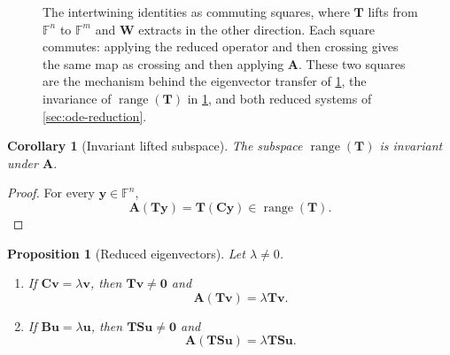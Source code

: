 \documentclass[11pt]{article}
\newcommand{\F}{\mathbb{F}}
\newcommand{\mat}[1]{\mathbf{#1}}
\newcommand{\vect}[1]{\mathbf{#1}}
\newcommand{\range}{\operatorname{range}}
\newtheorem{proposition}[proposition]{Proposition}
\newtheorem{corollary}[corollary]{Corollary}
\theoremstyle{definition}
\theoremstyle{remark}
\begin{document}
\begin{figure}[!ht]
  \centering
  \caption{The intertwining identities as commuting squares, where \(\mat{T}\) lifts from \(\F^n\) to \(\F^m\) and \(\mat{W}\) extracts in the other direction. Each square commutes: applying the reduced operator and then crossing gives the same map as crossing and then applying \(\mat{A}\). These two squares are the mechanism behind the eigenvector transfer of \cref{prop:reduced-eigenvectors}, the invariance of \(\range(\mat{T})\) in \cref{cor:invariant-range}, and both reduced systems of \cref{sec:ode-reduction}.}
  \label{fig:intertwining}
\end{figure}

\begin{corollary}[Invariant lifted subspace]
\label{cor:invariant-range}
The subspace \(\range(\mat{T})\) is invariant under \(\mat{A}\).
\end{corollary}

\begin{proof}
For every \(\vect{y}\in\F^n\),
\[
  \mat{A}(\mat{T}\vect{y})
  =\mat{T}(\mat{C}\vect{y})
  \in\range(\mat{T}).
\]
\end{proof}

\begin{proposition}[Reduced eigenvectors]
\label{prop:reduced-eigenvectors}
Let \(\lambda\neq0\).
\begin{enumerate}[label=(\alph*)]
  \item If \(\mat{C}\vect{v}=\lambda\vect{v}\), then
  \(\mat{T}\vect{v}\neq\vect{0}\) and
  \[
    \mat{A}(\mat{T}\vect{v})
    =\lambda\mat{T}\vect{v}.
  \]
  \item If \(\mat{B}\vect{u}=\lambda\vect{u}\), then
  \(\mat{T}\mat{S}\vect{u}\neq\vect{0}\) and
  \[
    \mat{A}(\mat{T}\mat{S}\vect{u})
    =\lambda\mat{T}\mat{S}\vect{u}.
  \]
\end{enumerate}
\end{proposition}
\end{document}
